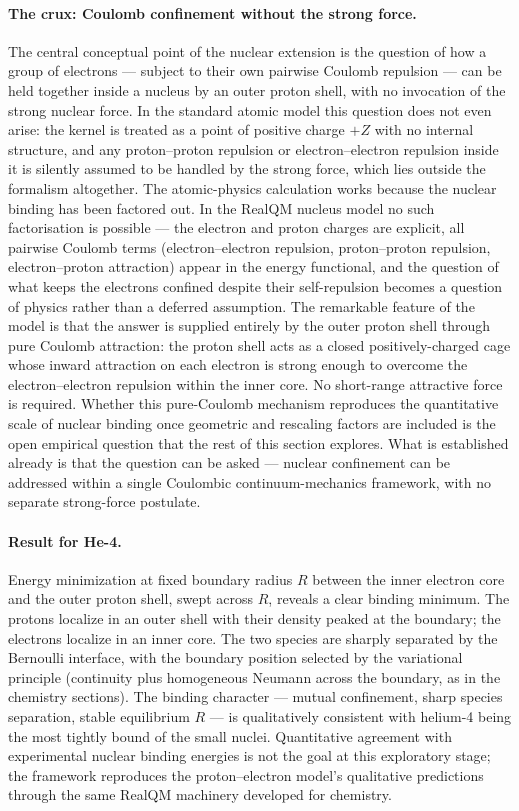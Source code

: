 \documentclass[11pt]{article}
\begin{document}
\paragraph{The crux: Coulomb confinement without the strong force.}
The central conceptual point of the nuclear extension is the question of how a group of electrons --- subject to their own pairwise Coulomb repulsion --- can be held together inside a nucleus by an outer proton shell, with no invocation of the strong nuclear force. In the standard atomic model this question does not even arise: the kernel is treated as a point of positive charge $+Z$ with no internal structure, and any proton--proton repulsion or electron--electron repulsion inside it is silently assumed to be handled by the strong force, which lies outside the formalism altogether. The atomic-physics calculation works because the nuclear binding has been factored out. In the RealQM nucleus model no such factorisation is possible --- the electron and proton charges are explicit, all pairwise Coulomb terms (electron--electron repulsion, proton--proton repulsion, electron--proton attraction) appear in the energy functional, and the question of what keeps the electrons confined despite their self-repulsion becomes a question of physics rather than a deferred assumption. The remarkable feature of the model is that the answer is supplied entirely by the outer proton shell through pure Coulomb attraction: the proton shell acts as a closed positively-charged cage whose inward attraction on each electron is strong enough to overcome the electron--electron repulsion within the inner core. No short-range attractive force is required. Whether this pure-Coulomb mechanism reproduces the quantitative scale of nuclear binding once geometric and rescaling factors are included is the open empirical question that the rest of this section explores. What is established already is that the question can be asked --- nuclear confinement can be addressed within a single Coulombic continuum-mechanics framework, with no separate strong-force postulate.

\paragraph{Result for He-4.}
Energy minimization at fixed boundary radius $R$ between the inner electron core and the outer proton shell, swept across $R$, reveals a clear binding minimum. The protons localize in an outer shell with their density peaked at the boundary; the electrons localize in an inner core. The two species are sharply separated by the Bernoulli interface, with the boundary position selected by the variational principle (continuity plus homogeneous Neumann across the boundary, as in the chemistry sections). The binding character --- mutual confinement, sharp species separation, stable equilibrium $R$ --- is qualitatively consistent with helium-4 being the most tightly bound of the small nuclei. Quantitative agreement with experimental nuclear binding energies is not the goal at this exploratory stage; the framework reproduces the proton--electron model's qualitative predictions through the same RealQM machinery developed for chemistry.
\end{document}
